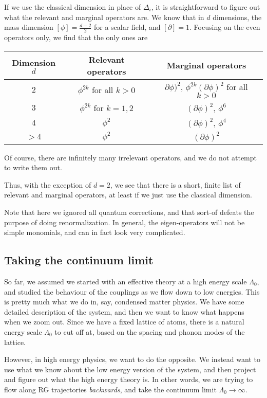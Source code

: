 \documentclass[a4paper]{article}
\begin{document}
If we use the classical dimension in place of $\Delta_i$, it is straightforward to figure out what the relevant and marginal operators are. We know that in $d$ dimensions, the mass dimension $[\phi] = \frac{d - 2}{2}$ for a scalar field, and $[\partial] = 1$. Focusing on the even operators only, we find that the only ones are
\begin{center}
  \begin{tabular}{ccc}
    \toprule
    Dimension $d$ & Relevant operators & Marginal operators\\
    \midrule
    $2$ & $\phi^{2k}$ for all $k > 0$ & $\partial \phi)^2$, $\phi^{2k} (\partial \phi)^2$ for all $k > 0$\\
    $3$ & $\phi^{2k}$ for $k = 1, 2$ & $(\partial \phi)^2$, $\phi^6$\\
    $4$ & $\phi^2$ & $(\partial \phi)^2$, $\phi^4$\\
    $> 4$ & $\phi^2$ & $(\partial \phi)^2$\\
    \bottomrule
  \end{tabular}
\end{center}
Of course, there are infinitely many irrelevant operators, and we do not attempt to write them out.

Thus, with the exception of $d = 2$, we see that there is a short, finite list of relevant and marginal operators, at least if we just use the classical dimension.

Note that here we ignored all quantum corrections, and that sort-of defeats the purpose of doing renormalization. In general, the eigen-operators will not be simple monomials, and can in fact look very complicated.

\subsection{Taking the continuum limit}
So far, we assumed we started with an effective theory at a high energy scale $\Lambda_0$, and studied the behaviour of the couplings as we flow down to low energies. This is pretty much what we do in, say, condensed matter physics. We have some detailed description of the system, and then we want to know what happens when we zoom out. Since we have a fixed lattice of atoms, there is a natural energy scale $\Lambda_0$ to cut off at, based on the spacing and phonon modes of the lattice.

However, in high energy physics, we want to do the opposite. We instead want to use what we know about the low energy version of the system, and then project and figure out what the high energy theory is. In other words, we are trying to flow along RG trajectories \emph{backwards}, and take the continuum limit $\Lambda_0 \to \infty$.
\end{document}
